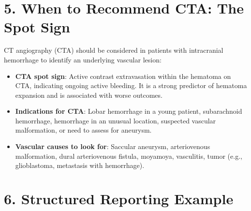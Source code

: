 \section{5. When to Recommend CTA: The Spot Sign}

CT angiography (CTA) should be considered in patients with intracranial hemorrhage to identify an underlying vascular lesion:

\begin{itemize}
  \item \textbf{CTA spot sign}: Active contrast extravasation within the hematoma on CTA, indicating ongoing active bleeding. It is a strong predictor of hematoma expansion and is associated with worse outcomes.
  \item \textbf{Indications for CTA}: Lobar hemorrhage in a young patient, subarachnoid hemorrhage, hemorrhage in an unusual location, suspected vascular malformation, or need to assess for aneurysm.
  \item \textbf{Vascular causes to look for}: Saccular aneurysm, arteriovenous malformation, dural arteriovenous fistula, moyamoya, vasculitis, tumor (e.g., glioblastoma, metastasis with hemorrhage).
\end{itemize}


\section{6. Structured Reporting Example}

